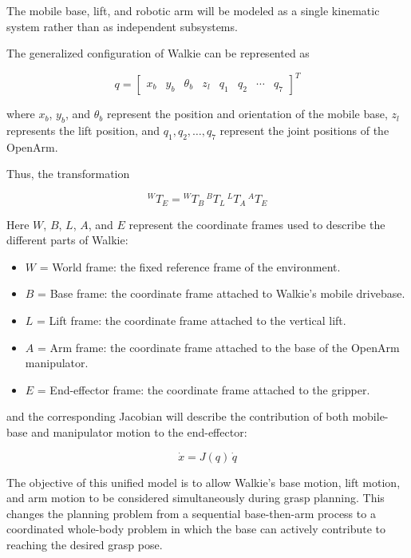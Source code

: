 \documentclass[12pt,a4paper]{article}
\begin{document}
The mobile base, lift, and robotic arm will be modeled as a single kinematic system rather than
as independent subsystems.

The generalized configuration of Walkie can be represented as

\begin{equation}
q = \begin{bmatrix} x_b & y_b & \theta_b & z_l & q_1 & q_2 & \cdots & q_7 \end{bmatrix}^{T}
\end{equation}

where $x_b$, $y_b$, and $\theta_b$ represent the position and orientation of the mobile base, $z_l$ represents
the lift position, and $q_1, q_2, \ldots, q_7$ represent the joint positions of the OpenArm.

Thus, the transformation

\begin{equation}
{}^{W}T_{E} = {}^{W}T_{B}\, {}^{B}T_{L}\, {}^{L}T_{A}\, {}^{A}T_{E}
\end{equation}

Here $W$, $B$, $L$, $A$, and $E$ represent the coordinate frames used to describe the different parts of
Walkie:

\begin{itemize}
  \item $W$ = World frame: the fixed reference frame of the environment.
  \item $B$ = Base frame: the coordinate frame attached to Walkie's mobile drivebase.
  \item $L$ = Lift frame: the coordinate frame attached to the vertical lift.
  \item $A$ = Arm frame: the coordinate frame attached to the base of the OpenArm manipulator.
  \item $E$ = End-effector frame: the coordinate frame attached to the gripper.
\end{itemize}

and the corresponding Jacobian will describe the contribution of both mobile-base and
manipulator motion to the end-effector:

\begin{equation}
\dot{x} = J(q)\,\dot{q}
\end{equation}

The objective of this unified model is to allow Walkie's base motion, lift motion, and arm
motion to be considered simultaneously during grasp planning. This changes the planning
problem from a sequential base-then-arm process to a coordinated whole-body problem in
which the base can actively contribute to reaching the desired grasp pose.
\end{document}

